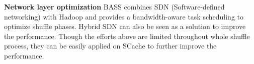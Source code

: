 \textbf{Network layer optimization} 
{\color{black}
BASS\cite{qin2017bandwidth} combines SDN (Software-defined networking) with Hadoop and provides a bandwidth-aware task scheduling to optimize shuffle phases.
Hybrid SDN \cite{huang2018survey} can also be seen as a solution to improve the performance.
Though the efforts above are limited throughout whole shuffle process, they can be easily applied on SCache to further improve the performance.
}

